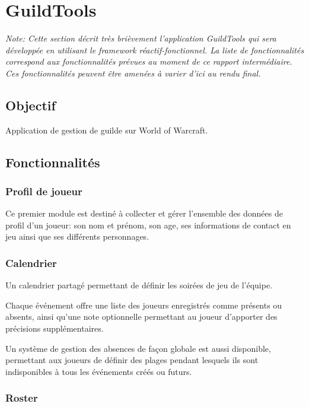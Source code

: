 \chapter{GuildTools}

\textit{Note: Cette section décrit très brièvement l'application GuildTools qui sera développée en utilisant le framework réactif-fonctionnel. La liste de fonctionnalités correspond aux fonctionnalités prévues au moment de ce rapport intermédiaire. Ces fonctionnalités peuvent être amenées à varier d'ici au rendu final. }

\section{Objectif}

Application de gestion de guilde sur World of Warcraft.

\section{Fonctionnalités}

	\subsection{Profil de joueur}

	Ce premier module est destiné à collecter et gérer l'ensemble des données de profil d'un joueur: son nom et prénom, son age, ses informations de contact en jeu ainsi que ses différents personnages.

	\subsection{Calendrier}
	
	Un calendrier partagé permettant de définir les soirées de jeu de l'équipe. 
	
	Chaque événement offre une liste des joueurs enregistrés comme présents ou absents, ainsi qu'une note optionnelle permettant au joueur d'apporter des précisions supplémentaires.
	
	Un système de gestion des absences de façon globale est aussi disponible, permettant aux joueurs de définir des plages pendant lesquels ils sont indisponibles à tous les événements créés ou futurs.
	
	\subsection{Roster}
	
